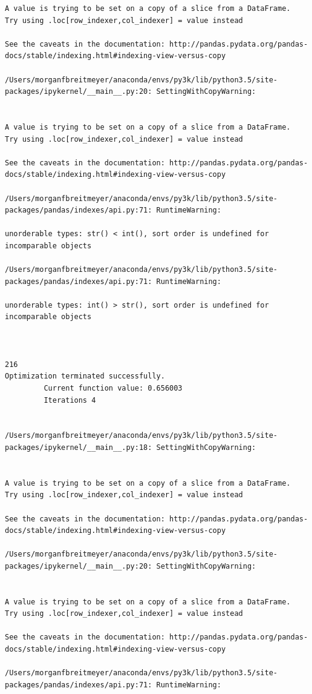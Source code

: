 \begin{lstlisting}
A value is trying to be set on a copy of a slice from a DataFrame.
Try using .loc[row_indexer,col_indexer] = value instead

See the caveats in the documentation: http://pandas.pydata.org/pandas-docs/stable/indexing.html#indexing-view-versus-copy

/Users/morganfbreitmeyer/anaconda/envs/py3k/lib/python3.5/site-packages/ipykernel/__main__.py:20: SettingWithCopyWarning:


A value is trying to be set on a copy of a slice from a DataFrame.
Try using .loc[row_indexer,col_indexer] = value instead

See the caveats in the documentation: http://pandas.pydata.org/pandas-docs/stable/indexing.html#indexing-view-versus-copy

/Users/morganfbreitmeyer/anaconda/envs/py3k/lib/python3.5/site-packages/pandas/indexes/api.py:71: RuntimeWarning:

unorderable types: str() < int(), sort order is undefined for incomparable objects

/Users/morganfbreitmeyer/anaconda/envs/py3k/lib/python3.5/site-packages/pandas/indexes/api.py:71: RuntimeWarning:

unorderable types: int() > str(), sort order is undefined for incomparable objects



216
Optimization terminated successfully.
         Current function value: 0.656003
         Iterations 4


/Users/morganfbreitmeyer/anaconda/envs/py3k/lib/python3.5/site-packages/ipykernel/__main__.py:18: SettingWithCopyWarning:


A value is trying to be set on a copy of a slice from a DataFrame.
Try using .loc[row_indexer,col_indexer] = value instead

See the caveats in the documentation: http://pandas.pydata.org/pandas-docs/stable/indexing.html#indexing-view-versus-copy

/Users/morganfbreitmeyer/anaconda/envs/py3k/lib/python3.5/site-packages/ipykernel/__main__.py:20: SettingWithCopyWarning:


A value is trying to be set on a copy of a slice from a DataFrame.
Try using .loc[row_indexer,col_indexer] = value instead

See the caveats in the documentation: http://pandas.pydata.org/pandas-docs/stable/indexing.html#indexing-view-versus-copy

/Users/morganfbreitmeyer/anaconda/envs/py3k/lib/python3.5/site-packages/pandas/indexes/api.py:71: RuntimeWarning:


\end{lstlisting}
